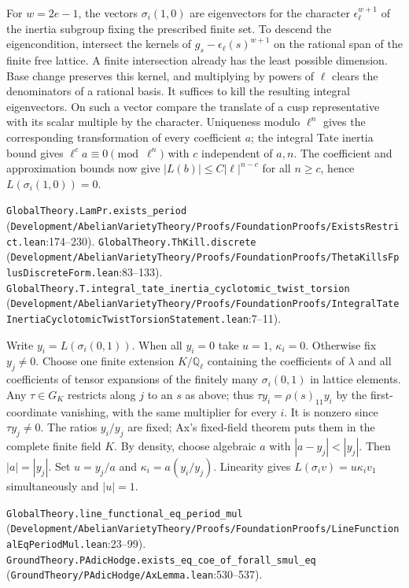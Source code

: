 For $w=2e-1$, the vectors $\sigma_i(1,0)$ are eigenvectors for the character $\epsilon_\ell^{w+1}$ of the inertia subgroup fixing the prescribed finite set. To descend the eigencondition, intersect the kernels of $g_s-\epsilon_\ell(s)^{w+1}$ on the rational span of the finite free lattice. A finite intersection already has the least possible dimension. Base change preserves this kernel, and multiplying by powers of $\ell$ clears the denominators of a rational basis. It suffices to kill the resulting integral eigenvectors. On such a vector compare the translate of a cusp representative with its scalar multiple by the character. Uniqueness modulo $\ell^n$ gives the corresponding transformation of every coefficient $a$; the integral Tate inertia bound gives $\ell^c a\equiv0\pmod{\ell^n}$ with $c$ independent of $a,n$. The coefficient and approximation bounds now give $|L(b)|\le C|\ell|^{n-c}$ for all $n\ge c$, hence $L(\sigma_i(1,0))=0$.
\par{\footnotesize \nolinkurl{GlobalTheory.LamPr.exists_period} (\nolinkurl{Development/AbelianVarietyTheory/Proofs/FoundationProofs/ExistsRestrict.lean}\allowbreak:174--230). \nolinkurl{GlobalTheory.ThKill.discrete} (\nolinkurl{Development/AbelianVarietyTheory/Proofs/FoundationProofs/ThetaKillsFplusDiscreteForm.lean}\allowbreak:83--133). \nolinkurl{GlobalTheory.T.integral_tate_inertia_cyclotomic_twist_torsion} (\nolinkurl{Development/AbelianVarietyTheory/Proofs/FoundationProofs/IntegralTateInertiaCyclotomicTwistTorsionStatement.lean}\allowbreak:7--11).\par}

Write $y_i=L(\sigma_i(0,1))$. When all $y_i=0$ take $u=1$, $\kappa_i=0$. Otherwise fix $y_j\ne0$. Choose one finite extension $K/\mathbb Q_\ell$ containing the coefficients of $\lambda$ and all coefficients of tensor expansions of the finitely many $\sigma_i(0,1)$ in lattice elements. Any $\tau\in G_K$ restricts along $j$ to an $s$ as above; thus $\tau y_i=\rho(s)_{11}y_i$ by the first-coordinate vanishing, with the same multiplier for every $i$. It is nonzero since $\tau y_j\ne0$. The ratios $y_i/y_j$ are fixed; Ax's fixed-field theorem puts them in the complete finite field $K$. By density, choose algebraic $a$ with $|a-y_j|<|y_j|$. Then $|a|=|y_j|$. Set $u=y_j/a$ and $\kappa_i=a(y_i/y_j)$. Linearity gives $L(\sigma_i v)=u\kappa_i v_1$ simultaneously and $|u|=1$.
\par{\footnotesize \nolinkurl{GlobalTheory.line_functional_eq_period_mul} (\nolinkurl{Development/AbelianVarietyTheory/Proofs/FoundationProofs/LineFunctionalEqPeriodMul.lean}\allowbreak:23--99). \nolinkurl{GroundTheory.PAdicHodge.exists_eq_coe_of_forall_smul_eq} (\nolinkurl{GroundTheory/PAdicHodge/AxLemma.lean}\allowbreak:530--537).\par}

